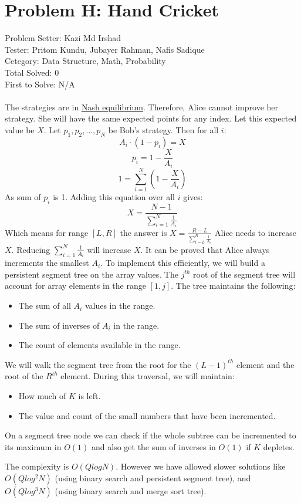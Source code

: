 \section*{Problem H: Hand Cricket}
Problem Setter: Kazi Md Irshad \\
Tester: Pritom Kundu, Jubayer Rahman, Nafis Sadique \\
Cetegory: Data Structure, Math, Probability \\
Total Solved: 0 \\
First to Solve: N/A \\
\\
The strategies are in \href{https://en.wikipedia.org/wiki/Nash_equilibrium}{Nash equilibrium}. Therefore, Alice cannot improve her strategy. She will have the same expected points for any index. Let this expected value be $X$. Let $p_1, p_2, \dots, p_N$ be Bob's strategy. Then for all $i$:
$$ A_i \cdot (1 - p_i) = X $$
$$p_i = 1 - \frac{X}{A_i}$$
$$1 = \sum_{i=1}^N(1-\frac{X}{A_i})$$
As sum of $p_i$ is 1. Adding this equation over all $i$ gives:
$$ X = \frac{N - 1}{\sum_{i=1}^N \frac{1}{A_i}}$$ 
Which means for range $[L,R]$ the answer is $X = \frac{R-L}{\sum_{i=L}^R \frac{1}{A_i}}$
Alice needs to increase $X$. Reducing $\sum_{i=1}^N \frac{1}{A_i}$ will increase $X$. It can be proved that Alice always increments the smallest $A_i$. To implement this efficiently, we will build a persistent segment tree on the array values. The $j^{th}$ root of the segment tree will account for array elements in the range $[1, j]$. The tree maintains the following:
\begin{itemize}
    \item The sum of all $A_i$ values in the range.
    \item The sum of inverses of $A_i$ in the range.
    \item The count of elements available in the range.
\end{itemize}
We will walk the segment tree from the root for the $(L-1)^{th}$ element and the root of the $R^{th}$ element. During this traversal, we will maintain:
\begin{itemize}
    \item How much of $K$ is left.
    \item The value and count of the small numbers that have been incremented.
\end{itemize}
On a segment tree node we can check if the whole subtree can be incremented to its maximum in $O(1)$ and also get the sum of inverses in $O(1)$ if $K$ depletes.

The complexity is $O(QlogN)$. However we have allowed slower solutions like $O(Qlog^2N)$ (using binary search and persistent segment tree), and $O(Qlog^3N)$ (using binary search and merge sort tree).
